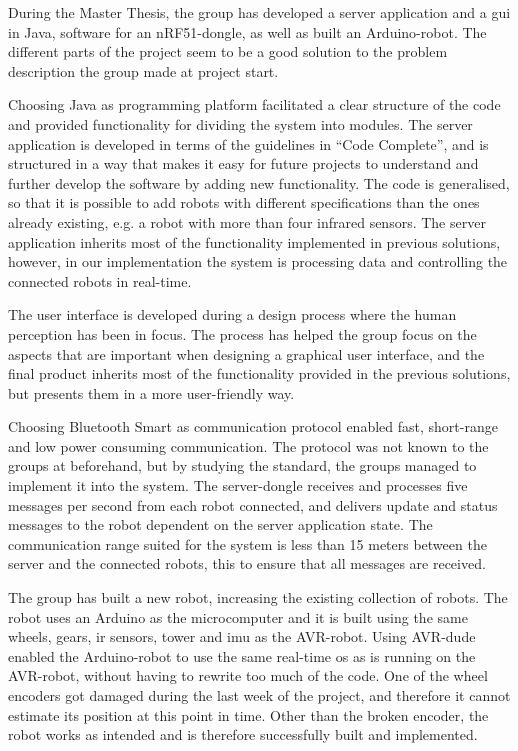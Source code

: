 During the Master Thesis, the group has developed a server application and a \acrlong{gui} in Java, software for an nRF51-dongle, as well as built an Arduino-robot. The different parts of the project seem to be a good solution to the problem description the group made at project start.

Choosing Java as programming platform facilitated a clear structure of the code and provided functionality for dividing the system into modules. The server application is developed in terms of the guidelines in ``Code Complete'', and is structured in a way that makes it easy for future projects to understand and further develop the software by adding new functionality. The code is generalised, so that it is possible to add robots with different specifications than the ones already existing, e.g. a robot with more than four infrared sensors. The server application inherits most of the functionality implemented in previous solutions, however, in our implementation the system is processing data and controlling the connected robots in real-time.

The user interface is developed during a design process where the human perception has been in focus. The process has helped the group focus on the aspects that are important when designing a graphical user interface, and the final product inherits most of the functionality provided in the previous solutions, but presents them in a more user-friendly way.

Choosing Bluetooth Smart as communication protocol enabled fast, short-range and low power consuming communication. The protocol was not known to the groups at beforehand, but by studying the standard, the groups managed to implement it into the system. The server-dongle receives and processes five messages per second from each robot connected, and delivers update and status messages to the robot dependent on the server application state. The communication range suited for the system is less than 15 meters between the server and the connected robots, this to ensure that all messages are received.

The group has built a new robot, increasing the existing collection of robots. The robot uses an Arduino as the microcomputer and it is built using the same wheels, gears, \acrlong{ir} sensors, tower and \acrlong{imu} as the AVR-robot. Using AVR-dude enabled the Arduino-robot to use the same real-time \acrlong{os} as is running on the AVR-robot, without having to rewrite too much of the code. One of the wheel encoders got damaged during the last week of the project, and therefore it cannot estimate its position at this point in time. Other than the broken encoder, the robot works as intended and is therefore successfully built and implemented.

